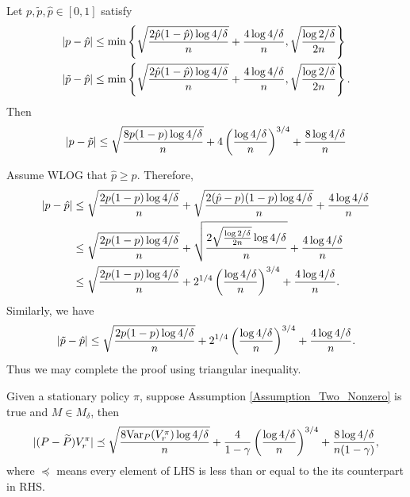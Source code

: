 \begin{lemma}\label{Lemma_Distance_between_P_tilde_P}
Let $p,\tilde p,\hat p\in[0,1]$ satisfy
$$
\begin{aligned}
|p-\hat p|&\leq \min\left\{{\sqrt{\frac{2 \hat p(1-\hat p) \log 4/\delta}{n}}+\frac{4\log 4/\delta}{n},\sqrt{\frac{ \log 2/\delta}{2 n}}}\right\}\\
|\tilde p-\hat p|&\leq \min\left\{{\sqrt{\frac{2 \hat p(1-\hat p) \log 4/\delta}{n}}+\frac{4\log 4/\delta}{n},\sqrt{\frac{ \log 2/\delta}{2 n}}}\right\}.
\end{aligned}
$$
Then
$$
|p-\tilde p|\leq \sqrt{\frac{8 p(1- p) \log 4/\delta}{n}}+4\left({\frac{ \log 4/\delta}{n}}\right)^{3/4}+\frac{8\log 4/\delta}{n}
$$
\end{lemma}

Assume WLOG that $\hat p\geq p$.
Therefore,
$$\begin{aligned}
    |p-\hat p|&\leq \sqrt{\frac{2 p(1- p) \log 4/\delta}{n}}+\sqrt{\frac{2 (\hat p- p)(1- p) \log 4/\delta}{n}}+\frac{4\log 4/\delta}{n}\\
    &\leq \sqrt{\frac{2 p(1- p) \log 4/\delta}{n}}+\sqrt{\frac{2 \sqrt{\frac{ \log 2/\delta}{2 n}} \log 4/\delta}{n}}+\frac{4\log 4/\delta}{n}\\
    &\leq \sqrt{\frac{2 p(1-p) \log 4/\delta}{n}}+2^{1/4}\left({\frac{ \log 4/\delta}{n}}\right)^{3/4}+\frac{4\log 4/\delta}{n}.
\end{aligned}
$$
Similarly, we have
$$|\tilde p-\hat p|\leq \sqrt{\frac{2 p(1-p) \log 4/\delta}{n}}+2^{1/4}\left({\frac{ \log 4/\delta}{n}}\right)^{3/4}+\frac{4\log 4/\delta}{n}.
$$
Thus we may complete the proof using triangular inequality.
\endproof

\begin{lemma}\label{Lemma_Quasi_Bernstein}
Given a stationary policy $\pi$, suppose Assumption \ref{Assumption_Two_Nonzero} is true and $M\in M_\delta$, then 
$$
|(P-\widetilde P)V_r^\pi|\preceq \sqrt{\frac{8\mathrm{Var}_P(V_r^\pi)\log 4/\delta}{n}}+\frac{4}{1-\gamma}\left({\frac{\log 4/\delta}{n}}\right)^{3/4}+\frac{8\log 4/\delta}{n(1-\gamma)},
$$
where $\preceq$ means every element of LHS is less than or equal to the its counterpart in RHS.
\end{lemma}

